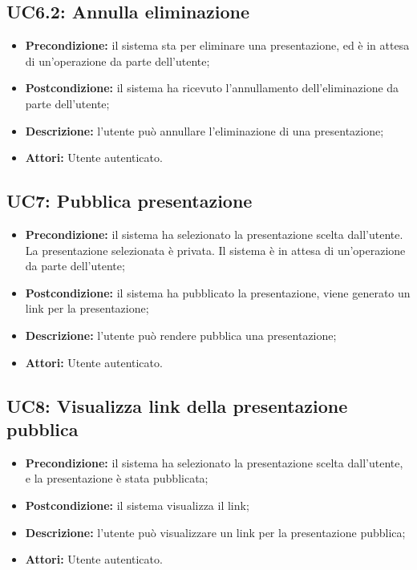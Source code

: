 \subsection{ UC6.2: Annulla eliminazione}

\begin{itemize}
	\item \textbf{Precondizione:} il sistema sta per eliminare una presentazione, ed è in attesa di un'operazione da parte dell'utente;
	\item \textbf{Postcondizione:} il sistema ha ricevuto l'annullamento dell'eliminazione da parte dell'utente;
	\item \textbf{Descrizione:} l'utente può annullare l'eliminazione di una presentazione;
	\item \textbf{Attori:} Utente autenticato.
\end{itemize}
\subsection{ UC7: Pubblica presentazione}

\begin{itemize}
	\item \textbf{Precondizione:} il sistema ha selezionato la presentazione scelta dall'utente. La presentazione selezionata è privata. Il sistema è in attesa di un'operazione da parte dell'utente;
	\item \textbf{Postcondizione:} il sistema ha pubblicato la presentazione, viene generato un link per la presentazione;
	\item \textbf{Descrizione:} l'utente può rendere pubblica una presentazione;
	\item \textbf{Attori:} Utente autenticato.
\end{itemize}
\subsection{ UC8: Visualizza link della presentazione pubblica}

\begin{itemize}
	\item \textbf{Precondizione:} il sistema ha selezionato la presentazione scelta dall'utente, e la presentazione è stata pubblicata;
	\item \textbf{Postcondizione:} il sistema visualizza il link;
	\item \textbf{Descrizione:} l'utente può visualizzare un link per la presentazione pubblica;
	\item \textbf{Attori:} Utente autenticato.
\end{itemize}
